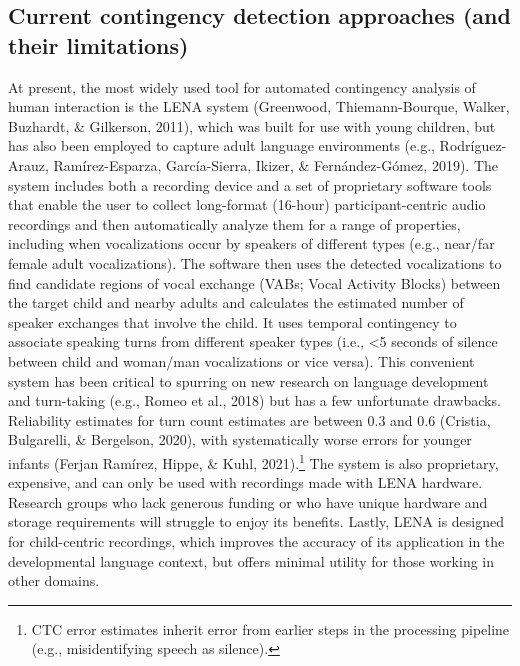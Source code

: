\documentclass[10pt, letterpaper]{article}
\begin{document}
\hypertarget{current-contingency-detection-approaches-and-their-limitations}{%
\subsection{Current contingency detection approaches (and their
limitations)}\label{current-contingency-detection-approaches-and-their-limitations}}

At present, the most widely used tool for automated contingency analysis
of human interaction is the LENA system (Greenwood, Thiemann-Bourque,
Walker, Buzhardt, \& Gilkerson, 2011), which was built for use with
young children, but has also been employed to capture adult language
environments (e.g., Rodríguez-Arauz, Ramírez-Esparza, García-Sierra,
Ikizer, \& Fernández-Gómez, 2019). The system includes both a recording
device and a set of proprietary software tools that enable the user to
collect long-format (16-hour) participant-centric audio recordings and
then automatically analyze them for a range of properties, including
when vocalizations occur by speakers of different types (e.g., near/far
female adult vocalizations). The software then uses the detected
vocalizations to find candidate regions of vocal exchange (VABs; Vocal
Activity Blocks) between the target child and nearby adults and
calculates the estimated number of speaker exchanges that involve the
child. It uses temporal contingency to associate speaking turns from
different speaker types (i.e., \textless5 seconds of silence between
child and woman/man vocalizations or vice versa). This convenient system
has been critical to spurring on new research on language development
and turn-taking (e.g., Romeo et al., 2018) but has a few unfortunate
drawbacks. Reliability estimates for turn count estimates are between
0.3 and 0.6 (Cristia, Bulgarelli, \& Bergelson, 2020), with
systematically worse errors for younger infants (Ferjan Ramírez, Hippe,
\& Kuhl, 2021).\footnote{CTC error estimates inherit error from earlier
  steps in the processing pipeline (e.g., misidentifying speech as
  silence).} The system is also proprietary, expensive, and can only be
used with recordings made with LENA hardware. Research groups who lack
generous funding or who have unique hardware and storage requirements
will struggle to enjoy its benefits. Lastly, LENA is designed for
child-centric recordings, which improves the accuracy of its application
in the developmental language context, but offers minimal utility for
those working in other domains.
\end{document}
